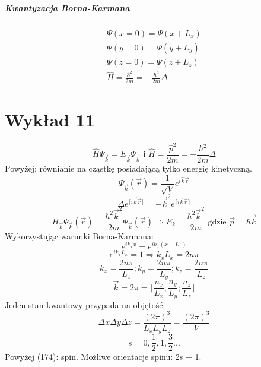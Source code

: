 \documentclass{article}
\begin{document}
		\subparagraph{Kwantyzacja Borna-Karmana}
		\begin{equation}
		\begin{array}{cc}
		\Psi(x=0) = \Psi(x+L_x) \\
		\Psi(y = 0) = \Psi(y + L_y) \\
		\Psi(z=0) = \Psi(z + L_z) \\
		\hat{H} = \frac{\hat{o}^2}{2m} = -\frac{\hbar^2}{2m}\Delta
		\end{array}
		\end{equation}
	\section{Wykład 11}
		\begin{equation}
			\hat{H}\Psi_{\vec{k}} = E_{\vec{k}}\Psi _{\vec{k}} \text{ i } 
			\hat{H} = \frac{\hat{p}^2}{2m} = - \frac{\hbar^2}{2m}\Delta
		\end{equation}
		Powyżej: równianie na cząstkę posiadającą tylko energię kinetyczną.
		\begin{equation}
		\Psi _{\vec{k}}(\vec{r}) = \frac{1}{\sqrt{V}} e^{i\vec{k}\vec{r}}
		\end{equation}
		\begin{equation}
		\Delta e^{\lceil i\vec{k}\vec{r} \rceil}  = -\vec{k}^2e^{\lceil i\vec{k}\vec{r} \rceil} 
		\end{equation}
		\begin{equation}
			H_{\vec{k}}\Psi_{\vec{k}}(\vec{r}) = \frac{\hbar^2\vec{k}^2}{2m}\Psi_{\vec{k}}(\vec{r}) \Rightarrow
			E_k = \frac{\hbar^2\vec{k}^2}{2m} \text{ gdzie } \vec{p} = \hbar \vec{k}
		\end{equation}
		Wykorzystując warunki Borna-Karmana:
		\begin{equation}
		e^{ik_xx} = e^{ik_x(x+L_x)}
		\end{equation}
		\begin{equation}
		e^{ik_xL_x} = 1 \Rightarrow k_xL_x = 2n\pi
		\end{equation}
		\begin{equation}
		k_x = \frac{2n\pi}{L_x}; k_y = \frac{2n\pi}{L_y}; k_z = \frac{2n\pi}{L_z}
		\end{equation}
		\begin{equation}
			\vec{k} = 2\pi = \lceil \frac{n_x}{L_x};\frac{n_y}{L_y};\frac{n_z}{L_z}\rceil
		\end{equation}
		Jeden stan kwantowy przypada na objętość:
		\begin{equation}
			\Delta x \Delta y \Delta z = \frac{(2\pi)^3}{L_xL_yL_z} = \frac{(2\pi)^3}{V}
		\end{equation}
		\begin{equation}
			s = 0, \frac{1}{2}, 1, \frac{3}{2} ...
		\end{equation}
		Powyżej (174): spin. Możliwe orientacje spinu: 2s + 1.
\end{document}
